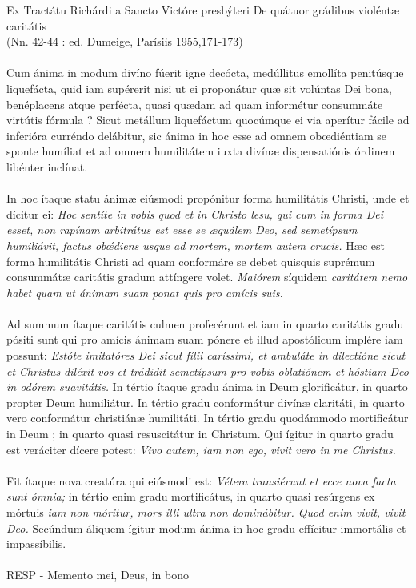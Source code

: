 \documentclass[options]{article}
\begin{document}
	Ex Tractátu Richárdi a Sancto Victóre presbýteri De quátuor grádibus violéntæ caritátis\\
	(Nn. 42-44 : ed. Dumeige, Parísiis 1955,171-173)\\\\
	Cum ánima in modum divíno fúerit igne decócta, medúllitus emollíta penitúsque liquefácta, quid iam supérerit nisi ut ei proponátur quæ sit volúntas Dei bona, benéplacens atque perfécta, quasi quædam ad quam informétur consummáte virtútis fórmula ? Sicut metállum liquefáctum quocúmque ei via aperítur fácile ad inferióra curréndo delábitur, sic ánima in hoc esse ad omnem obœdiéntiam se sponte humíliat et ad omnem humilitátem iuxta divínæ dispensatiónis órdinem libénter inclínat.\\
	\\
	In hoc ítaque statu ánimæ eiúsmodi propónitur forma humilitátis Christi, unde et dícitur ei: 
	\textit{Hoc sentíte in vobis quod et in Christo lesu, qui cum in forma Dei esset, non rapínam arbitrátus est esse se æquálem Deo, sed semetípsum humiliávit, factus ob\'{œ}diens usque ad mortem, mortem autem crucis.}
	Hæc est forma humilitátis Christi ad quam conformáre se debet quisquis suprémum consummátæ caritátis gradum attíngere volet.
	\textit{Maiórem}
	síquidem
	\textit{caritátem nemo habet quam ut ánimam suam ponat quis pro amícis suis.}\\
	\\
	Ad summum ítaque caritátis culmen profecérunt et iam in quarto caritátis gradu pósiti sunt qui pro amícis ánimam suam pónere et illud apostólicum implére iam possunt:
	\textit{Estóte imitatóres Dei sicut fílii caríssimi, et ambuláte in dilectióne sicut et Christus diléxit vos et trádidit semetípsum pro vobis oblatiónem et hóstiam Deo in odórem suavitátis.}
	  In tértio ítaque gradu ánima in Deum glorificátur, in quarto propter Deum humiliátur. In tértio gradu conformátur divínæ claritáti, in quarto vero conformátur christiánæ humilitáti. In tértio gradu quodámmodo mortificátur in Deum ; in quarto quasi resuscitátur in Christum. Qui ígitur in quarto gradu est veráciter dícere potest:
	  \textit{Vivo autem, iam non ego, vivit vero in me Christus.} \\
	  \\
	  Fit ítaque nova creatúra qui eiúsmodi est:
	  \textit{Vétera transiérunt et ecce nova facta sunt ómnia;}
	   in tértio enim gradu mortificátus, in quarto quasi resúrgens ex mórtuis
	   \textit{iam non móritur, mors illi ultra non dominábitur. Quod enim vivit, vivit Deo.}
	   Secúndum áliquem ígitur modum ánima in hoc gradu effícitur immortális et impassíbilis.\\
	   \\
	   
	   RESP - Memento mei, Deus, in bono
	   
	
	
	 
	
	
\end{document}
